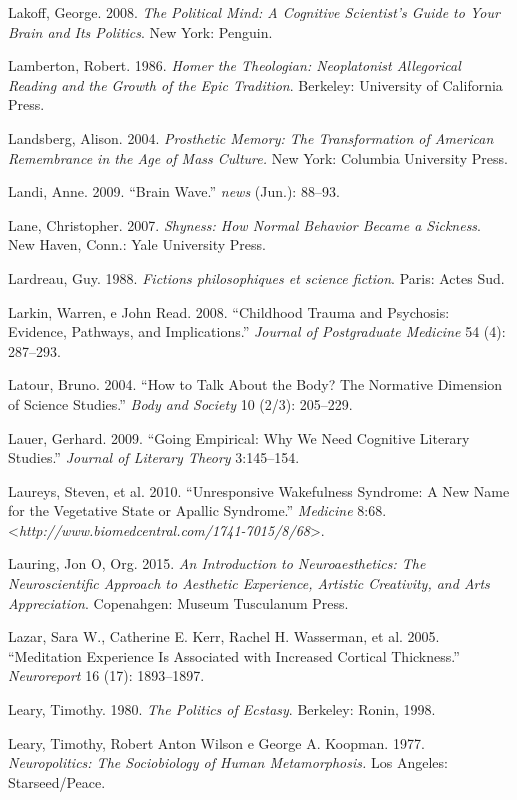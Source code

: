 Lakoff, George. 2008. \emph{The Political Mind: A Cognitive Scientist's
Guide to Your Brain and Its Politics}. New York: Penguin.

Lamberton, Robert. 1986. \emph{Homer the Theologian: Neoplatonist
Allegorical Reading and the Growth of the Epic Tradition}. Berkeley:
University of California Press.

Landsberg, Alison. 2004. \emph{Prosthetic Memory: The Transformation of
American Remembrance in the Age of Mass Culture.} New York: Columbia
University Press.

Landi, Anne. 2009. ``Brain Wave.'' \emph{news} (Jun.): 88--93.

Lane, Christopher. 2007. \emph{Shyness: How Normal Behavior Became a
Sickness}. New Haven, Conn.: Yale University Press.

Lardreau, Guy. 1988. \emph{Fictions philosophiques et science fiction}.
Paris: Actes Sud.

Larkin, Warren, e John Read. 2008. ``Childhood Trauma and Psychosis:
Evidence, Pathways, and Implications.'' \emph{Journal of Postgraduate
Medicine} 54 (4): 287--293.

Latour, Bruno. 2004. ``How to Talk About the Body? The Normative
Dimension of Science Studies.'' \emph{Body and Society} 10 (2/3):
205--229.

Lauer, Gerhard. 2009. ``Going Empirical: Why We Need Cognitive Literary
Studies.'' \emph{Journal of Literary Theory} 3:145--154.

Laureys, Steven, et al. 2010. ``Unresponsive Wakefulness Syndrome: A New
Name for the Vegetative State or Apallic Syndrome.'' \emph{ Medicine}
8:68. \textless{}\emph{http://www.biomedcentral.com/1741-7015/8/68}\textgreater{}.

Lauring, Jon O, Org. 2015. \emph{An Introduction to Neuroaesthetics: The
Neuroscientific Approach to Aesthetic Experience, Artistic Creativity,
and Arts Appreciation}. Copenahgen: Museum Tusculanum Press.

Lazar, Sara W., Catherine E. Kerr, Rachel H. Wasserman, et al. 2005.
``Meditation Experience Is Associated with Increased Cortical
Thickness.'' \emph{Neuroreport} 16 (17): 1893--1897.

Leary, Timothy. 1980. \emph{The Politics of Ecstasy}. Berkeley: Ronin,
1998.

Leary, Timothy, Robert Anton Wilson e George A. Koopman. 1977.
\emph{Neuropolitics: The Sociobiology of Human Metamorphosis.} Los
Angeles: Starseed/Peace.

